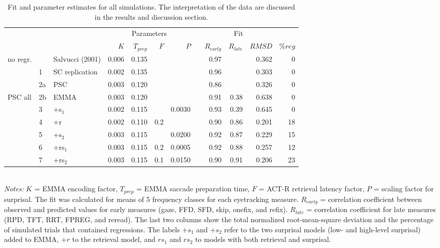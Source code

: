 \begin{table}
\centering
\begin{tabular}{lllrrrrrrrrr}
\hline
 & & & \multicolumn{4}{c}{Parameters} & & \multicolumn{3}{c}{Fit} & \\ \cline{4-7} \cline{9-11}
  &   &   & $K$ & $T_{prep}$ & $F$ & $P$ &   & $R_{early}$ & $R_{late}$ & $RMSD$ & $\%reg$ \\ 
 \hline
no regr. &  & Salvucci (2001) & 0.006 & 0.135 &  &  &  & 0.97 &  & 0.362 & 0 \\ 
   & 1 & SC replication & 0.002 & 0.135 &  &  &  & 0.96 &  & 0.303 & 0 \\ 
   & 2a & PSC & 0.003 & 0.120 &  &  &  & 0.86 &  & 0.326 & 0 \\ 
 \hline
PSC all & 2b & EMMA & 0.003 & 0.120 &  &  &  & 0.91 & 0.38 & 0.638 & 0 \\ 
   & 3 & +s$_1$ & 0.002 & 0.115 &  & 0.0030 &  & 0.93 & 0.39 & 0.645 & 0 \\ 
   & 4 & +r & 0.002 & 0.110 & 0.2 &  &  & 0.90 & 0.86 & 0.201 & 18 \\ 
   & 5 & +s$_2$ & 0.003 & 0.115 &  & 0.0200 &  & 0.92 & 0.87 & 0.229 & 15 \\ 
   & 6 & +rs$_1$ & 0.003 & 0.115 & 0.2 & 0.0005 &  & 0.92 & 0.88 & 0.257 & 12 \\ 
   & 7 & +rs$_2$ & 0.003 & 0.115 & 0.1 & 0.0150 &  & 0.90 & 0.91 & 0.206 & 23 \\
 \hline 
\end{tabular} \\ 
\footnotesize{
\emph{Notes:} $K$ = EMMA encoding factor, $T_{prep}$ = EMMA saccade preparation time, $F$ = ACT-R retrieval latency factor, $P$ = scaling factor for surprisal. The fit was calculated for means of 5 frequency classes for each eyetracking measure. $R_{early}$ = correlation coefficient between observed and predicted values for early measures (gaze, FFD, SFD, skip, onefix, and refix). $R_{late}$ = correlation coefficient for late measures (RPD, TFT, RRT, FPREG, and reread). The last two columns show the total normalized root-mean-square deviation and the percentage of simulated trials that contained regressions. The labels $+s_1$ and $+s_2$ refer to the two surprisal models (low- and high-level surprisal) added to EMMA, $+r$ to the retrieval model, and $rs_1$ and $rs_2$ to models with both retrieval and surprisal.}
\caption{Fit and parameter estimates for all simulations. The interpretation of the data are discussed in the results and discussion section.}\label{simtable}
\end{table}

